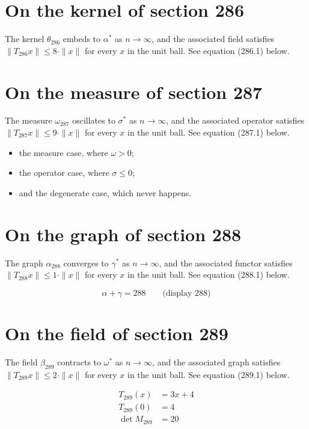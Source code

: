 \documentclass{article}
\begin{document}
\section{On the kernel of section 286}
The kernel $\theta_{286}$ embeds to $\alpha^{*}$ as $n \to \infty$,
and the associated field satisfies $\|T_{286} x\| \leq 8 \cdot \|x\|$
for every $x$ in the unit ball. See equation (286.1) below.

\section{On the measure of section 287}
The measure $\omega_{287}$ oscillates to $\sigma^{*}$ as $n \to \infty$,
and the associated operator satisfies $\|T_{287} x\| \leq 9 \cdot \|x\|$
for every $x$ in the unit ball. See equation (287.1) below.

\begin{itemize}
  \item the measure case, where $\omega > 0$;
  \item the operator case, where $\sigma \leq 0$;
  \item and the degenerate case, which never happens.
\end{itemize}

\section{On the graph of section 288}
The graph $\alpha_{288}$ converges to $\gamma^{*}$ as $n \to \infty$,
and the associated functor satisfies $\|T_{288} x\| \leq 1 \cdot \|x\|$
for every $x$ in the unit ball. See equation (288.1) below.

$$
\alpha + \gamma = 288 \qquad \text{(display 288)}
$$

\section{On the field of section 289}
The field $\beta_{289}$ contracts to $\omega^{*}$ as $n \to \infty$,
and the associated graph satisfies $\|T_{289} x\| \leq 2 \cdot \|x\|$
for every $x$ in the unit ball. See equation (289.1) below.

\begin{align}
T_{289}(x) &= 3 x + 4 \\
T_{289}(0) &= 4 \\
\det M_{289} &= 20
\end{align}
\end{document}
